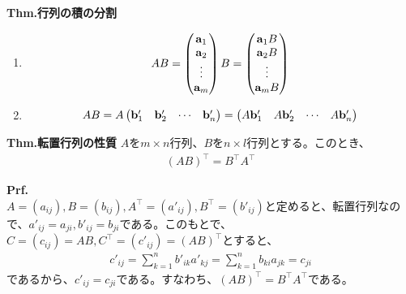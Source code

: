 \documentclass[a4paper,11pt]{jsarticle}
\numberwithin{equation}{section}
\begin{document}
\begin{itembox}[l]{\textbf{Thm.行列の積の分割}}
\begin{enumerate}
\begin{align}
\begin{pmatrix}
    \end{pmatrix}  
    =
    \begin{pmatrix}
      \vb{a}'_1 \vb{b}_1 & \vb{a}'_1 \vb{b}_2 & \cdots & \vb{a}'_1 \vb{b}_n\\
      \vb{a}'_2 \vb{b}_1 & \vb{a}'_2 \vb{b}_2 & \cdots & \vb{a}'_2 \vb{b}_n\\
      \vdots & \vdots & \ddots & \vdots\\
      \vb{a}'_m \vb{b}_1 & \vb{a}'_m \vb{b}_2 & \cdots & \vb{a}'_m \vb{b}_n
    \end{pmatrix}
  \end{align}%
  \item 
  \begin{align}
    AB = \begin{pmatrix}
      \vb{a}_1\\
      \vb{a}_2\\
      \vdots\\
      \vb{a}_m
    \end{pmatrix}
    B
    =
    \begin{pmatrix}
      \vb{a}_1 B\\
      \vb{a}_2 B\\
      \vdots\\
      \vb{a}_m B
    \end{pmatrix}
  \end{align}
  \item
  \begin{align}
    AB = A
    \begin{pmatrix}
      \vb{b}'_1 & \vb{b}'_2 & \cdots & \vb{b}'_n
    \end{pmatrix}
    =
    \begin{pmatrix}
      A \vb{b}'_1 & A \vb{b}'_2 & \cdots & A \vb{b}'_n
    \end{pmatrix}
  \end{align}
  \end{enumerate}
\end{itembox}

\begin{itembox}[l]{\textbf{Thm.転置行列の性質}}
  $A$を$m \times n$行列、$B$を$n \times l$行列とする。このとき、
  \begin{align}
    (AB)^{\top} = B^{\top}A^{\top}
  \end{align}
\end{itembox}
\textbf{Prf.}\\
  $A = (a_{ij}), B = (b_{ij}),A^{\top} = (a'_{ij}),B^{\top} = (b'_{ij})$と定めると、転置行列なので、$a'_{ij} = a_{ji},b'_{ij} = b_{ji}$である。このもとで、
  $C = (c_{ij}) = AB, C^{\top} = (c'_{ij}) = (AB)^{\top}$とすると、
  \begin{align}
    c'_{ij} = \sum_{k=1}^{n} b'_{ik}a'_{kj} = \sum_{k=1}^{n} b_{ki}a_{jk} = c_{ji}
  \end{align}
  であるから、$c'_{ij} = c_{ji}$である。すなわち、$(AB)^{\top} = B^{\top}A^{\top}$である。\hfill\qedsymbol\\
\end{document}
